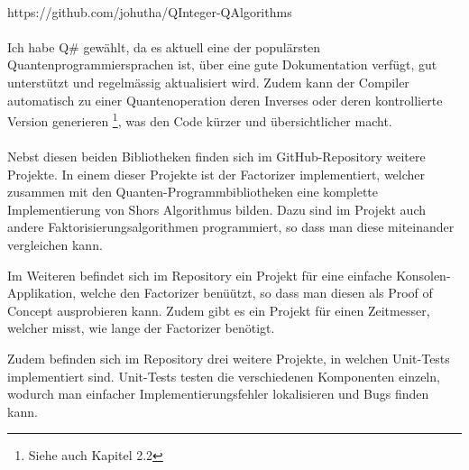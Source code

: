 \paragraph{}
\centerline{ https://github.com/johutha/QInteger-QAlgorithms }
\paragraph{}

Ich habe Q\# gewählt, da es aktuell eine der populärsten Quantenprogrammiersprachen ist, über eine gute Dokumentation verfügt, gut unterstützt und regelmässig aktualisiert wird. Zudem kann der Compiler automatisch zu einer Quantenoperation deren Inverses oder deren kontrollierte Version generieren \footnote{Siehe auch Kapitel 2.2}, was den Code kürzer und übersichtlicher macht.

\paragraph{}

Nebst diesen beiden Bibliotheken finden sich im GitHub-Repository weitere Projekte. In einem dieser Projekte ist der \grqq Factorizer\grqq{} implementiert, welcher zusammen mit den Quanten-Programmbibliotheken eine komplette Implementierung von Shors Algorithmus bilden. Dazu sind im Projekt auch andere Faktorisierungsalgorithmen programmiert, so dass man diese miteinander vergleichen kann.

Im Weiteren befindet sich im Repository ein Projekt für eine einfache Konsolen-Applikation, welche den \grqq Factorizer\grqq{} benüützt, so dass man diesen als Proof of Concept ausprobieren kann. Zudem gibt es ein Projekt für einen Zeitmesser, welcher misst, wie lange der \grqq Factorizer \grqq{} benötigt.

Zudem befinden sich im Repository drei weitere Projekte, in welchen Unit-Tests implementiert sind. Unit-Tests testen die verschiedenen Komponenten einzeln, wodurch man einfacher Implementierungsfehler lokalisieren und Bugs finden kann.